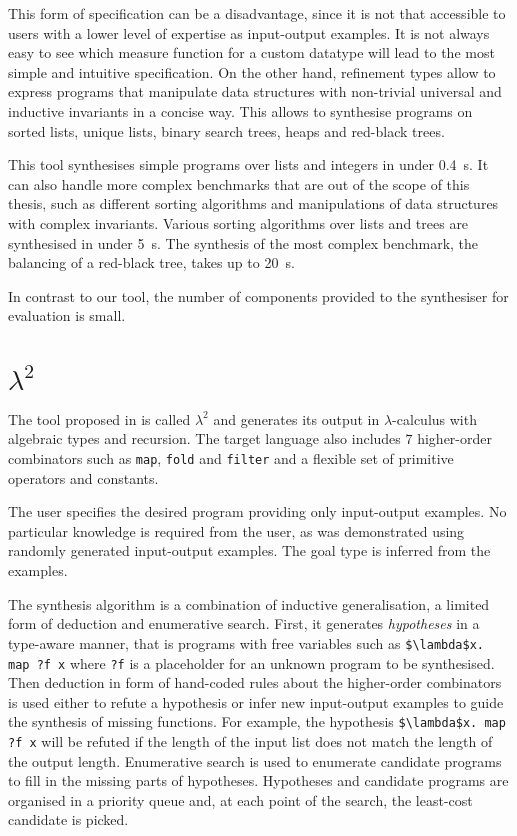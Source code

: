 This form of specification can be a disadvantage, since it is not that accessible to users with a lower level of expertise as input-output examples. It is not always easy to see which measure function for a custom datatype will lead to the most simple and intuitive specification.
On the other hand, refinement types allow to express programs that manipulate data structures with non-trivial universal and inductive invariants in a concise way. This allows to synthesise programs on sorted lists, unique lists, binary search trees, heaps and red-black trees.

This tool synthesises simple programs over lists and integers in under \SI{0.4}{s}. It can also handle more complex benchmarks that are out of the scope of this thesis, such as different sorting algorithms and manipulations of data structures with complex invariants. Various sorting algorithms over lists and trees are synthesised in under \SI{5}{s}. The synthesis of the most complex benchmark, the balancing of a red-black tree, takes up to \SI{20}{s}.

In contrast to our tool, the number of components provided to the synthesiser for evaluation is small.

\section{$\lambda^2$}

The tool proposed in \cite{LambdaSquarePaper} is called $\lambda^2$ and generates its output in $\lambda$-calculus with algebraic types and recursion. The target language also includes $7$ higher-order combinators such as \lstinline!map!, \lstinline!fold! and \lstinline!filter! and a flexible set of primitive operators and constants.

The user specifies the desired program providing only input-output examples. No particular knowledge is required from the user, as was demonstrated using randomly generated input-output examples. The goal type is inferred from the examples.

The synthesis algorithm is a combination of inductive generalisation, a limited form of deduction and enumerative search.
First, it generates \emph{hypotheses} in a type-aware manner, that is programs with free variables such as \lstinline!$\lambda$x. map ?f x! where \lstinline!?f! is a placeholder for an unknown program to be synthesised.
Then deduction in form of hand-coded rules about the higher-order combinators is used either to refute a hypothesis or infer new input-output examples to guide the synthesis of missing functions. For example, the hypothesis \lstinline!$\lambda$x. map ?f x! will be refuted if the length of the input list does not match the length of the output length.
Enumerative search is used to enumerate candidate programs to fill in the missing parts of hypotheses. Hypotheses and candidate programs are organised in a priority queue and, at each point of the search, the least-cost candidate is picked.

